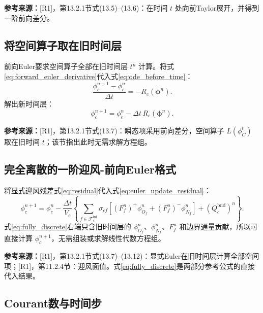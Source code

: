 \documentclass[UTF8,12pt,a4paper]{ctexart}
\numberwithin{equation}{section}
\newcommand{\Rone}{\textnormal{[R1]}}
\newcommand{\source}[1]{%
  \par\smallskip
  \noindent\colorbox{sourcebg}{%
    \parbox{0.955\linewidth}{\footnotesize\color{sourcegray}\textbf{参考来源：}#1}%
  }
  \par\smallskip
}
\newcommand{\phiv}{\bm\phi}
\begin{document}
\source{\Rone，第13.2.1节式(13.5)--(13.6)：在时间 $t$ 处向前Taylor展开，并得到一阶前向差分。}

\subsection{将空间算子取在旧时间层}

前向Euler要求空间算子全部在旧时间层 $t^n$ 计算。将式\eqref{eq:forward_euler_derivative}代入式\eqref{eq:ode_before_time}：
\begin{equation}
  \frac{\phi_c^{n+1}-\phi_c^n}{\Delta t}
  =-R_c(\phiv^n).
  \label{eq:euler_residual}
\end{equation}
解出新时间层：
\begin{equation}
  \boxed{
  \phi_c^{n+1}
  =\phi_c^n-\Delta t\,R_c(\phiv^n)
  }.
  \label{eq:euler_update_residual}
\end{equation}

\source{\Rone，第13.2.1节式(13.7)：瞬态项采用前向差分，空间算子 $L(\phi_C^t)$ 取在旧时间 $t$；该节指出此时无需求解方程组。}

\subsection{完全离散的一阶迎风-前向Euler格式}

将显式迎风残差式\eqref{eq:residual}代入式\eqref{eq:euler_update_residual}：
\begin{equation}
  \boxed{
  \phi_c^{n+1}
  =\phi_c^n
  -\frac{\Delta t}{V_c}
  \left\{
  \sum_{f\in\mathcal F_c^{\mathrm{int}}}
  \sigma_{cf}
  \left[
    (F_f^n)^+\phi_{O_f}^n
    +(F_f^n)^-\phi_{N_f}^n
  \right]
  +(Q_c^{\mathrm{bnd}})^n
  \right\}
  }.
  \label{eq:fully_discrete}
\end{equation}
式\eqref{eq:fully_discrete}右端只含旧时间层的 $\phi_{O_f}^n$、$\phi_{N_f}^n$、$F_f^n$ 和边界通量贡献，所以可直接计算 $\phi_c^{n+1}$，无需组装或求解线性代数方程组。

\source{\Rone，第13.2.1节式(13.7)--(13.12)：显式Euler在旧时间层计算全部空间项；\Rone，第11.2.4节：迎风面值。式\eqref{eq:fully_discrete}是两部分参考公式的直接代入结果。}

\subsection{Courant数与时间步}
\end{document}
